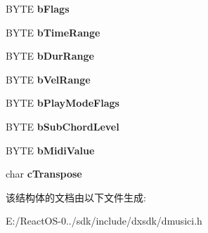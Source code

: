 \begin{DoxyCompactItemize}
B\+Y\+TE {\bfseries b\+Flags}
\item 
\mbox{\label{struct___d_m_u_s___n_o_t_e___p_m_s_g_abe9002075a5951f5b3f4dd941199ed87}} 
B\+Y\+TE {\bfseries b\+Time\+Range}
\item 
\mbox{\label{struct___d_m_u_s___n_o_t_e___p_m_s_g_ae0f5e879bae7e9249e2542f4f3631d9e}} 
B\+Y\+TE {\bfseries b\+Dur\+Range}
\item 
\mbox{\label{struct___d_m_u_s___n_o_t_e___p_m_s_g_a18af692a0eb2b7158dcc017269e54c3e}} 
B\+Y\+TE {\bfseries b\+Vel\+Range}
\item 
\mbox{\label{struct___d_m_u_s___n_o_t_e___p_m_s_g_a98c0a439579089ebb3ef3a42d5f6cb83}} 
B\+Y\+TE {\bfseries b\+Play\+Mode\+Flags}
\item 
\mbox{\label{struct___d_m_u_s___n_o_t_e___p_m_s_g_af4b7a01a9f5287ed52facffa0b31200c}} 
B\+Y\+TE {\bfseries b\+Sub\+Chord\+Level}
\item 
\mbox{\label{struct___d_m_u_s___n_o_t_e___p_m_s_g_a02f3a93ebadb8d58daf679a7fdf12494}} 
B\+Y\+TE {\bfseries b\+Midi\+Value}
\item 
\mbox{\label{struct___d_m_u_s___n_o_t_e___p_m_s_g_af00d52270c303c886ca5e764aee35a8c}} 
char {\bfseries c\+Transpose}
\end{DoxyCompactItemize}


该结构体的文档由以下文件生成\+:\begin{DoxyCompactItemize}
\item 
E\+:/\+React\+O\+S-\/0../sdk/include/dxsdk/dmusici.\+h\end{DoxyCompactItemize}
